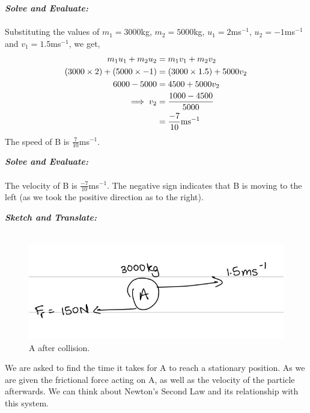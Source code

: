 \begin{subquestions}
\begin{subsubquestions}
\textbf{\textit{Solve and Evaluate:}} \\ \\
Substituting the values of $m_1=3000$kg, $m_2=5000$kg, $u_1=2$ms$^{-1}$, $u_2=-1$ms$^{-1}$ and $v_1=1.5$ms$^{-1}$, we get,
\begin{align}
	m_1u_1 + m_2u_2 & = m_1v_1 + m_2v_2 \nonumber \\
	(3000\times 2) + (5000\times -1) & = (3000\times 1.5) + 5000v_2 \nonumber \\
	6000-5000& = 4500 + 5000v_2 \nonumber \\
	\implies v_2 & = \frac{1000-4500}{5000} \nonumber \\
	             & = \frac{-7}{10} \text{ms}^{-1}
\end{align}
The speed of B is $\frac{7}{10}$ms$^{-1}$. 


\subsubquestion

\textbf{\textit{Solve and Evaluate:}} \\ \\
The velocity of B is $\frac{-7}{10}$ms$^{-1}$. The negative sign indicates that B is moving to the left (as we took the positive direction as to the right).
	

\subsubquestion

\textbf{\textit{Sketch and Translate:}} \\ \\
\begin{figure}[H]
	\begin{center}
		\includegraphics[scale=0.25]{../2016/figures/2016q6-4}
		\caption{\label{2016:q6:Sketch4} A after collision.}
	\end{center}
\end{figure}	
We are asked to find the time it takes for A to reach a stationary position. As we are given the frictional force acting on A, as well as the velocity of the particle afterwards. We can think about Newton's Second Law and its relationship with this system.
	

\end{subsubquestions}
\end{subquestions}
